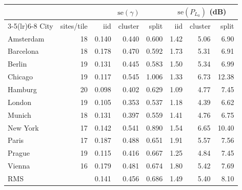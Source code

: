 \begin{tabular}{lrrrrrrr}
\toprule
& & \multicolumn{3}{c}{$\mathrm{se}(\gamma)$} & \multicolumn{3}{c}{$\mathrm{se}(P_{L_0})$ (dB)} \\
\cmidrule(lr){3-5}\cmidrule(lr){6-8}
City & sites/tile & iid & cluster & split & iid & cluster & split \\
\midrule
Amsterdam & 18 & 0.140 & 0.440 & 0.600 & 1.42 & 5.06 & 6.90 \\
Barcelona & 18 & 0.178 & 0.470 & 0.592 & 1.73 & 5.31 & 6.91 \\
Berlin & 19 & 0.131 & 0.445 & 0.583 & 1.50 & 5.34 & 6.99 \\
Chicago & 19 & 0.117 & 0.545 & 1.006 & 1.33 & 6.73 & 12.38 \\
Hamburg & 20 & 0.098 & 0.402 & 0.629 & 1.09 & 4.77 & 7.45 \\
London & 19 & 0.105 & 0.353 & 0.537 & 1.18 & 4.39 & 6.62 \\
Munich & 18 & 0.131 & 0.397 & 0.559 & 1.41 & 4.76 & 6.75 \\
New York & 17 & 0.142 & 0.541 & 0.890 & 1.54 & 6.65 & 10.40 \\
Paris & 17 & 0.187 & 0.488 & 0.651 & 1.91 & 5.57 & 7.56 \\
Prague & 19 & 0.115 & 0.416 & 0.667 & 1.25 & 4.84 & 7.45 \\
Vienna & 16 & 0.179 & 0.481 & 0.674 & 1.80 & 5.42 & 7.69 \\
\midrule
RMS & & 0.141 & 0.456 & 0.686 & 1.49 & 5.40 & 8.10 \\
\bottomrule
\end{tabular}
